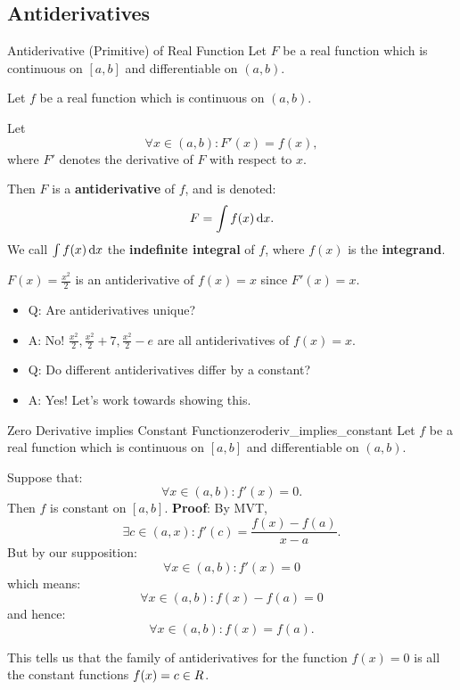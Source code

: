 \subsection{Antiderivatives}
\begin{Definition}{Antiderivative (Primitive) of Real Function}{}
    Let $ F $ be a real function which is continuous on $ [a,b] $ and differentiable on $ (a,b) $.\smallskip

    Let $ f $ be a real function which is continuous on $ (a,b) $.\bigskip

    Let
    \[ \forall x\in(a,b):F'(x)=f(x), \]
    where $ F' $ denotes the derivative of $ F $ with respect to $ x $.\bigskip

    Then $ F $ is a \textbf{antiderivative} of $ f $, and is denoted:
    \[ F=\int f(x)\odif{x}. \]
    We call $ \int f(x)\odif{x} $ the \textbf{indefinite integral} of $ f $,
    where $ f(x) $ is the \textbf{integrand}.
\end{Definition}
\begin{Example}{}{}
    $ F(x)=\frac{x^2}{2} $ is an antiderivative of $ f(x)=x $ since $ F'(x)=x $.
\end{Example}
\begin{itemize}
    \item Q\@: Are antiderivatives unique?
    \item A\@: No! $ \frac{x^2}{2},\frac{x^2}{2}+7,\frac{x^2}{2}-e $ are all antiderivatives of $ f(x)=x $.
    \item Q\@: Do different antiderivatives differ by a constant?
    \item A\@: Yes! Let's work towards showing this.
\end{itemize}
\begin{Theorem}{Zero Derivative implies Constant Function}{zeroderiv_implies_constant}
    Let $ f $ be a real function which is continuous on $ [a,b] $
    and differentiable on $ (a,b) $.\smallskip

    Suppose that:
    \[ \forall x\in(a,b):f'(x)=0. \]
    Then $ f $ is constant on $ [a,b] $.
    \tcblower{}
    \textbf{Proof}: By MVT,
    \[ \exists c\in(a,x):f'(c)=\frac{f(x)-f(a)}{x-a}. \]
    But by our supposition:
    \[ \forall x\in(a,b):f'(x)=0 \]
    which means:
    \[ \forall x\in(a,b):f(x)-f(a)=0 \]
    and hence:
    \[ \forall x\in(a,b):f(x)=f(a). \]
\end{Theorem}
This tells us that the family of antiderivatives for the function $ f(x)=0 $
is all the constant functions $ f(x)=c\in\relax{R} $.


